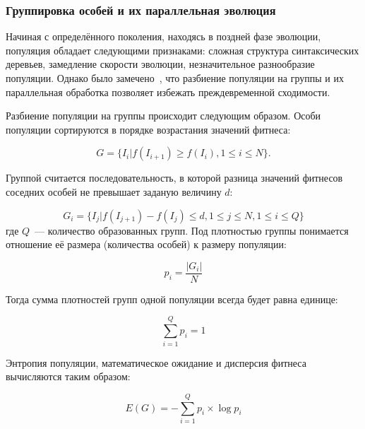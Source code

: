 
\subsubsection{Группировка особей и их параллельная эволюция}

Начиная с определённого поколения, находясь в поздней фазе эволюции, популяция обладает следующими признаками: сложная структура синтаксических деревьев, замедление скорости эволюции, незначительное разнообразие популяции. Однако было замечено~\cite{Jiang:2008:MPT:1473248.1474007}, что разбиение популяции на группы и их параллельная обработка позволяет избежать преждевременной сходимости.

Разбиение популяции на группы происходит следующим образом. Особи популяции сортируются в порядке возрастания значений фитнеса:

\begin{equation}
\label{eq:niches_G}
G = \{I_i | f(I_{i+1}) \ge f(I_i), 1 \le i \le N\}.
\end{equation}

Группой считается последовательность, в которой разница значений фитнесов соседних особей не превышает заданую величину $d$:

\begin{equation}
\label{eq:niches_G_i}
G_i = \{I_j | f(I_{j+1}) - f(I_j) \le d, 1 \le j \le N, 1 \le i \le Q\}
\end{equation}
где $Q$~--- количество образованных групп. Под плотностью группы понимается отношение её размера (количества особей) к размеру популяции:

\begin{equation}
\label{eq:niches_p_i}
p_i = \frac{|G_i|}{N}
\end{equation}

Тогда сумма плотностей групп одной популяции всегда будет равна единице:

\begin{equation}
\label{eq:niches_p_i_sum_1}
\sum\limits_{i=1}^Q{p_i} = 1
\end{equation}

Энтропия популяции, математическое ожидание и дисперсия фитнеса вычисляются таким образом:

\begin{equation}
\label{eq:niches_E}
E(G) = - \sum\limits_{i=1}^Q{p_i \times \log{p_i}}
\end{equation}


